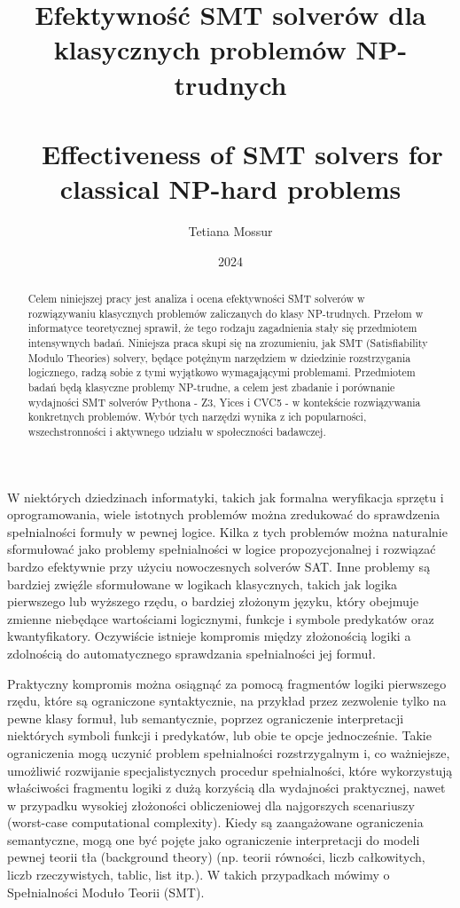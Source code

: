 \documentclass[xodstep]{wnspt}
\author   {Tetiana Mossur}
\date     {2024}
\title{Efektywność SMT solverów dla klasycznych problemów NP-trudnych
\\{~}
\\{~}
Effectiveness of SMT solvers for classical NP-hard problems}
\begin{document}
\begin{abstract}
Celem niniejszej pracy jest analiza i ocena efektywności SMT solverów w rozwiązywaniu klasycznych problemów zaliczanych do klasy NP-trudnych. Przełom w informatyce teoretycznej sprawił, że tego rodzaju zagadnienia stały się przedmiotem intensywnych badań. Niniejsza praca skupi się na zrozumieniu, jak SMT (Satisfiability Modulo Theories) solvery, będące potężnym narzędziem w dziedzinie rozstrzygania logicznego, radzą sobie z tymi wyjątkowo wymagającymi problemami.
Przedmiotem badań będą klasyczne problemy NP-trudne, a celem jest zbadanie i porównanie wydajności SMT solverów Pythona - Z3, Yices i CVC5 - w kontekście rozwiązywania konkretnych problemów. Wybór tych narzędzi wynika z ich popularności, wszechstronności i aktywnego udziału w społeczności badawczej.

\end{abstract}


\maketitle
\onehalfspacing

\introduction
W niektórych dziedzinach informatyki, takich jak formalna weryfikacja sprzętu i oprogramowania, wiele istotnych problemów można zredukować do sprawdzenia spełnialności formuły w pewnej logice. Kilka z tych problemów można naturalnie sformułować jako problemy spełnialności w logice propozycjonalnej i rozwiązać bardzo efektywnie przy użyciu nowoczesnych solverów SAT. Inne problemy są bardziej zwięźle sformułowane w logikach klasycznych, takich jak logika pierwszego lub wyższego rzędu, o bardziej złożonym języku, który obejmuje zmienne niebędące wartościami logicznymi, funkcje i symbole predykatów oraz kwantyfikatory. Oczywiście istnieje kompromis między złożonością logiki a zdolnością do automatycznego sprawdzania spełnialności jej formuł.

Praktyczny kompromis można osiągnąć za pomocą fragmentów logiki pierwszego rzędu, które są ograniczone syntaktycznie, na przykład przez zezwolenie tylko na pewne klasy formuł, lub semantycznie, poprzez ograniczenie interpretacji niektórych symboli funkcji i predykatów, lub obie te opcje jednocześnie. Takie ograniczenia mogą uczynić problem spełnialności rozstrzygalnym i, co ważniejsze, umożliwić rozwijanie specjalistycznych procedur spełnialności, które wykorzystują właściwości fragmentu logiki z dużą korzyścią dla wydajności praktycznej, nawet w przypadku wysokiej złożoności obliczeniowej dla najgorszych scenariuszy (worst-case computational complexity). Kiedy są zaangażowane ograniczenia semantyczne, mogą one być pojęte jako ograniczenie interpretacji do modeli pewnej teorii tła (background theory) (np. teorii równości, liczb całkowitych, liczb rzeczywistych, tablic, list itp.). W takich przypadkach mówimy o Spełnialności Moduło Teorii (SMT).
\end{document}
